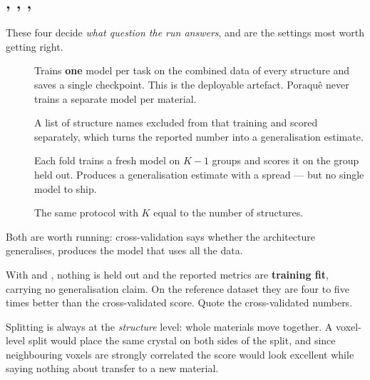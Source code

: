 \subsection{, , , }

These four decide \emph{what question the run answers}, and are the settings
most worth getting right.

\begin{description}
  \item[] Trains \textbf{one} model per task on the combined
    data of every structure and saves a single checkpoint. This is the
    deployable artefact. Poraqu\^e never trains a separate model per material.
  \item[] A list of structure names excluded from that training
    and scored separately, which turns the reported number into a
    generalisation estimate.
  \item[] Each fold trains a fresh model on $K-1$ groups and
    scores it on the group held out. Produces a generalisation estimate with a
    spread --- but no single model to ship.
  \item[] The same protocol with $K$ equal to the number
    of structures.
\end{description}

Both are worth running: cross-validation says whether the architecture
generalises,  produces the model that uses all the data.

\begin{pwarn}
With  and , nothing is held out and the
reported metrics are \textbf{training fit}, carrying no generalisation claim.
On the reference dataset they are four to five times better than the
cross-validated score. Quote the cross-validated numbers.
\end{pwarn}

\begin{ptip}
Splitting is always at the \emph{structure} level: whole materials move
together. A voxel-level split would place the same crystal on both sides of the
split, and since neighbouring voxels are strongly correlated the score would
look excellent while saying nothing about transfer to a new material.
\end{ptip}

\subsection{}

